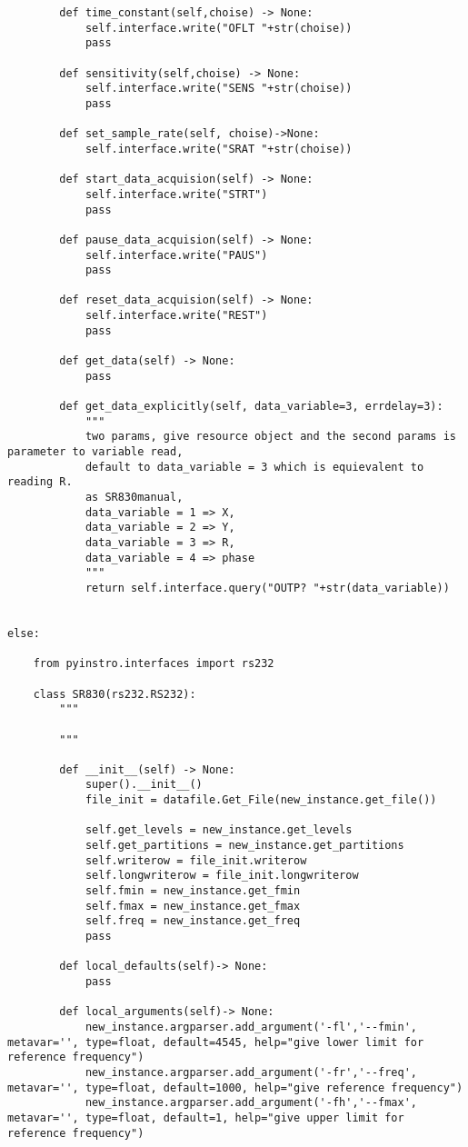 \begin{verbatim}
        def time_constant(self,choise) -> None:
            self.interface.write("OFLT "+str(choise))
            pass

        def sensitivity(self,choise) -> None:
            self.interface.write("SENS "+str(choise))
            pass

        def set_sample_rate(self, choise)->None:
            self.interface.write("SRAT "+str(choise))

        def start_data_acquision(self) -> None:
            self.interface.write("STRT")
            pass

        def pause_data_acquision(self) -> None:
            self.interface.write("PAUS")
            pass

        def reset_data_acquision(self) -> None:
            self.interface.write("REST")
            pass

        def get_data(self) -> None:
            pass

        def get_data_explicitly(self, data_variable=3, errdelay=3):
            """
            two params, give resource object and the second params is parameter to variable read,
            default to data_variable = 3 which is equievalent to reading R.
            as SR830manual, 
            data_variable = 1 => X,
            data_variable = 2 => Y,
            data_variable = 3 => R,
            data_variable = 4 => phase
            """
            return self.interface.query("OUTP? "+str(data_variable))

        
else:

    from pyinstro.interfaces import rs232
    
    class SR830(rs232.RS232):
        """
        
        """
        
        def __init__(self) -> None:
            super().__init__()
            file_init = datafile.Get_File(new_instance.get_file())
            
            self.get_levels = new_instance.get_levels
            self.get_partitions = new_instance.get_partitions
            self.writerow = file_init.writerow
            self.longwriterow = file_init.longwriterow
            self.fmin = new_instance.get_fmin
            self.fmax = new_instance.get_fmax
            self.freq = new_instance.get_freq
            pass

        def local_defaults(self)-> None:
            pass

        def local_arguments(self)-> None:
            new_instance.argparser.add_argument('-fl','--fmin', metavar='', type=float, default=4545, help="give lower limit for reference frequency")
            new_instance.argparser.add_argument('-fr','--freq', metavar='', type=float, default=1000, help="give reference frequency")
            new_instance.argparser.add_argument('-fh','--fmax', metavar='', type=float, default=1, help="give upper limit for reference frequency")


\end{verbatim}
